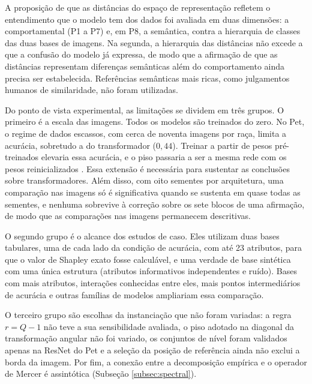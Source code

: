 A proposição de que as distâncias do espaço de representação refletem o entendimento que o modelo tem dos dados foi avaliada em duas dimensões: a comportamental (P1 a P7) e, em P8, a semântica, contra a hierarquia de classes das duas bases de imagens. Na segunda, a hierarquia das distâncias não excede a que a confusão do modelo já expressa, de modo que a afirmação de que as distâncias representam diferenças semânticas além do comportamento ainda precisa ser estabelecida. Referências semânticas mais ricas, como julgamentos humanos de similaridade, não foram utilizadas.

Do ponto de vista experimental, as limitações se dividem em três grupos. O primeiro é a escala das imagens. Todos os modelos são treinados do zero. No Pet, o regime de dados escassos, com cerca de noventa imagens por raça, limita a acurácia, sobretudo a do transformador ($0{,}44$). Treinar a partir de pesos pré-treinados elevaria essa acurácia, e o piso passaria a ser a mesma rede com os pesos reinicializados \citep{Adebayo2018}. Essa extensão é necessária para sustentar as conclusões sobre transformadores. Além disso, com oito sementes por arquitetura, uma comparação nas imagens só é significativa quando se sustenta em quase todas as sementes, e nenhuma sobrevive à correção sobre os sete blocos de uma afirmação, de modo que as comparações nas imagens permanecem descritivas.

O segundo grupo é o alcance dos estudos de caso. Eles utilizam duas bases tabulares, uma de cada lado da condição de acurácia, com até 23 atributos, para que o valor de Shapley exato fosse calculável, e uma verdade de base sintética com uma única estrutura (atributos informativos independentes e ruído). Bases com mais atributos, interações conhecidas entre eles, mais pontos intermediários de acurácia e outras famílias de modelos ampliariam essa comparação.

O terceiro grupo são escolhas da instanciação que não foram variadas: a regra $r=Q-1$ não teve a sua sensibilidade avaliada, o piso adotado na diagonal da transformação angular não foi variado, os conjuntos de nível foram validados apenas na ResNet do Pet e a seleção da posição de referência ainda não exclui a borda da imagem. Por fim, a conexão entre a decomposição empírica e o operador de Mercer é assintótica (Subseção \ref{subsec:spectral}).

